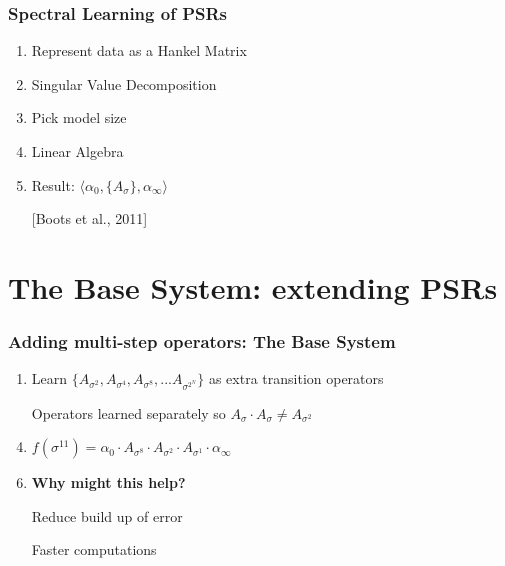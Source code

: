 \documentclass{beamer}
\begin{document}

\begin{frame}
\frametitle{Spectral Learning of PSRs}

\begin{enumerate}
\item Represent data as a Hankel Matrix
\item Singular Value Decomposition
\item Pick model size
\item Linear Algebra
\item Result: $\langle \alpha_0, \{A_\sigma\},\alpha_\infty \rangle$ 
\item[]
\item[] [Boots et al., 2011]
\end{enumerate}

\end{frame}

\section{The Base System: extending PSRs}

\begin{frame}
\frametitle{Adding multi-step operators: The Base System}
\begin{enumerate}

\item Learn $\{A_{\sigma^2}, A_{\sigma^4}, A_{\sigma^8}, ... A_{\sigma^{2^N}}\}$ as extra transition operators
\item[] Operators learned separately so $A_{\sigma} \cdot A_{\sigma} \neq A_{\sigma^2}$
\item[]

\item $f(\sigma^{11}) = \alpha_0 \cdot A_{\sigma^8} \cdot A_{\sigma^2} \cdot A_{\sigma^1} \cdot \alpha_\infty$
\item[]

\item \textbf{Why might this help?}
\item[] Reduce build up of error
\item[] Faster computations

\end{enumerate}
\end{frame}
\end{document}
